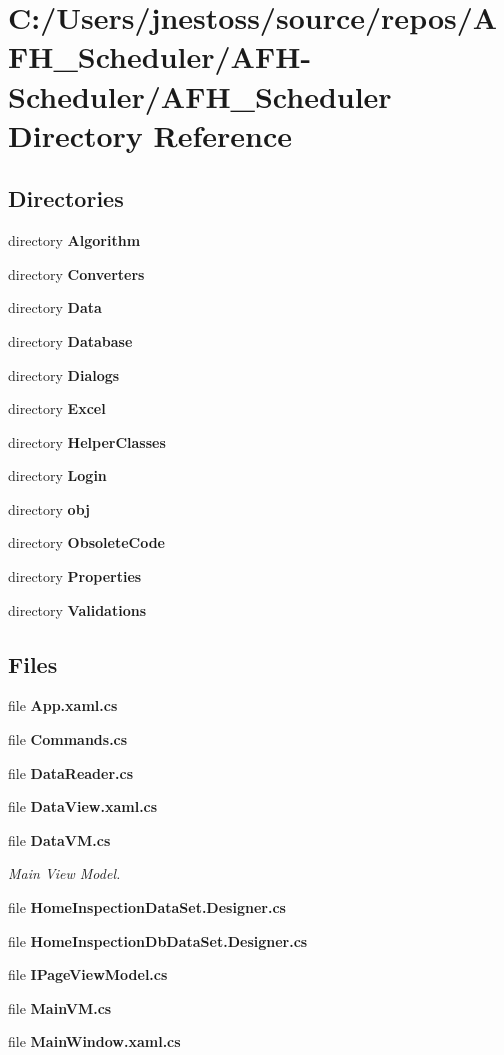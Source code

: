 \section{C\+:/\+Users/jnestoss/source/repos/\+A\+F\+H\+\_\+\+Scheduler/\+A\+F\+H-\/\+Scheduler/\+A\+F\+H\+\_\+\+Scheduler Directory Reference}
\label{dir_5315cbcad3ca2218ed76c37c925ccbda}
\subsection*{Directories}
\begin{DoxyCompactItemize}
\item 
directory \textbf{ Algorithm}
\item 
directory \textbf{ Converters}
\item 
directory \textbf{ Data}
\item 
directory \textbf{ Database}
\item 
directory \textbf{ Dialogs}
\item 
directory \textbf{ Excel}
\item 
directory \textbf{ Helper\+Classes}
\item 
directory \textbf{ Login}
\item 
directory \textbf{ obj}
\item 
directory \textbf{ Obsolete\+Code}
\item 
directory \textbf{ Properties}
\item 
directory \textbf{ Validations}
\end{DoxyCompactItemize}
\subsection*{Files}
\begin{DoxyCompactItemize}
\item 
file \textbf{ App.\+xaml.\+cs}
\item 
file \textbf{ Commands.\+cs}
\item 
file \textbf{ Data\+Reader.\+cs}
\item 
file \textbf{ Data\+View.\+xaml.\+cs}
\item 
file \textbf{ Data\+V\+M.\+cs}
\begin{DoxyCompactList}\small\item\em Main View Model. \end{DoxyCompactList}\item 
file \textbf{ Home\+Inspection\+Data\+Set.\+Designer.\+cs}
\item 
file \textbf{ Home\+Inspection\+Db\+Data\+Set.\+Designer.\+cs}
\item 
file \textbf{ I\+Page\+View\+Model.\+cs}
\item 
file \textbf{ Main\+V\+M.\+cs}
\item 
file \textbf{ Main\+Window.\+xaml.\+cs}
\end{DoxyCompactItemize}
